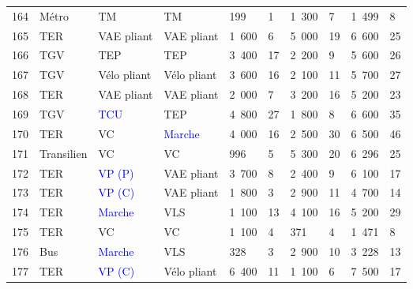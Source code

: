 \begin{longtable}{p{0.7cm}p{1.4cm}p{1.4cm}p{1.6cm}p{0.8cm}p{0.8cm}p{0.8cm}p{0.8cm}p{1.1cm}p{1.1cm}}
    \small{164} & \small{Métro} & \small{TM} & \small{TM} & \small{199} & \small{1} & \small{1~300} & \small{7} & \small{1~499} & \small{8}\\
    \small{165} & \small{TER} & \small{VAE pliant} & \small{VAE pliant} & \small{1~600} & \small{6} & \small{5~000} & \small{19} & \small{6~600} & \small{25}\\
    \small{166} & \small{TGV} & \small{TEP} & \small{TEP} & \small{3~400} & \small{17} & \small{2~200} & \small{9} & \small{5~600} & \small{26}\\
    \small{167} & \small{TGV} & \small{Vélo pliant} & \small{Vélo pliant} & \small{3~600} & \small{16} & \small{2~100} & \small{11} & \small{5~700} & \small{27}\\
    \small{168} & \small{TER} & \small{VAE pliant} & \small{VAE pliant} & \small{2~000} & \small{7} & \small{3~200} & \small{16} & \small{5~200} & \small{23}\\
    \small{169} & \small{TGV} & \small{\textcolor{blue}{TCU}} & \small{TEP} & \small{4~800} & \small{27} & \small{1~800} & \small{8} & \small{6~600} & \small{35}\\
    \small{170} & \small{TER} & \small{VC} & \small{\textcolor{blue}{Marche}} & \small{4~000} & \small{16} & \small{2~500} & \small{30} & \small{6~500} & \small{46}\\
    \small{171} & \small{Transilien} & \small{VC} & \small{VC} & \small{996} & \small{5} & \small{5~300} & \small{20} & \small{6~296} & \small{25}\\
    \small{172} & \small{TER} & \small{\textcolor{blue}{VP (P)}} & \small{VAE pliant} & \small{3~700} & \small{8} & \small{2~400} & \small{9} & \small{6~100} & \small{17}\\
    \small{173} & \small{TER} & \small{\textcolor{blue}{VP (C)}} & \small{VAE pliant} & \small{1~800} & \small{3} & \small{2~900} & \small{11} & \small{4~700} & \small{14}\\
    \small{174} & \small{TER} & \small{\textcolor{blue}{Marche}} & \small{VLS} & \small{1~100} & \small{13} & \small{4~100} & \small{16} & \small{5~200} & \small{29}\\
    \small{175} & \small{TER} & \small{VC} & \small{VC} & \small{1~100} & \small{4} & \small{371} & \small{4} & \small{1~471} & \small{8}\\
    \small{176} & \small{Bus} & \small{\textcolor{blue}{Marche}} & \small{VLS} & \small{328} & \small{3} & \small{2~900} & \small{10} & \small{3~228} & \small{13}\\
    \small{177} & \small{TER} & \small{\textcolor{blue}{VP (C)}} & \small{Vélo pliant} & \small{6~400} & \small{11} & \small{1~100} & \small{6} & \small{7~500} & \small{17}\\

\end{longtable}
